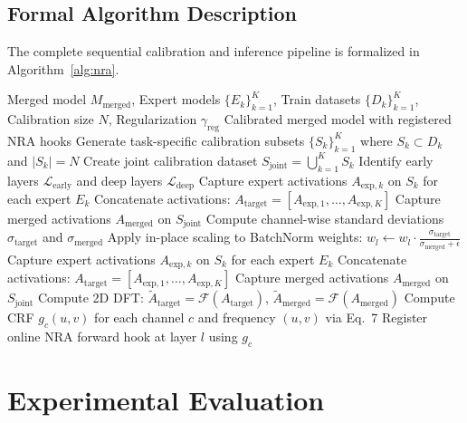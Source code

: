 \documentclass{article}
\theoremstyle{plain}
\theoremstyle{definition}
\theoremstyle{remark}
\begin{document}
\subsection{Formal Algorithm Description}
The complete sequential calibration and inference pipeline is formalized in Algorithm~\ref{alg:nra}.

\begin{algorithm}[H]
\caption{Sequential Hybrid SP-TAAC + NRA Calibration}
\label{alg:nra}
\begin{algorithmic}[1]
\REQUIRE Merged model $M_{\text{merged}}$, Expert models $\{E_k\}_{k=1}^K$, Train datasets $\{D_k\}_{k=1}^K$, Calibration size $N$, Regularization $\gamma_{\text{reg}}$
\ENSURE Calibrated merged model with registered NRA hooks
\STATE Generate task-specific calibration subsets $\{S_k\}_{k=1}^K$ where $S_k \subset D_k$ and $|S_k| = N$
\STATE Create joint calibration dataset $S_{\text{joint}} = \bigcup_{k=1}^K S_k$
\STATE Identify early layers $\mathcal{L}_{\text{early}}$ and deep layers $\mathcal{L}_{\text{deep}}$
    \STATE Capture expert activations $A_{\text{exp}, k}$ on $S_k$ for each expert $E_k$
    \STATE Concatenate activations: $A_{\text{target}} = [A_{\text{exp}, 1}, \dots, A_{\text{exp}, K}]$
    \STATE Capture merged activations $A_{\text{merged}}$ on $S_{\text{joint}}$
    \STATE Compute channel-wise standard deviations $\sigma_{\text{target}}$ and $\sigma_{\text{merged}}$
    \STATE Apply in-place scaling to BatchNorm weights: $w_l \leftarrow w_l \cdot \frac{\sigma_{\text{target}}}{\sigma_{\text{merged}} + \epsilon}$
\ENDFOR
{}
    \STATE Capture expert activations $A_{\text{exp}, k}$ on $S_k$ for each expert $E_k$
    \STATE Concatenate activations: $A_{\text{target}} = [A_{\text{exp}, 1}, \dots, A_{\text{exp}, K}]$
    \STATE Capture merged activations $A_{\text{merged}}$ on $S_{\text{joint}}$
    \STATE Compute 2D DFT: $\tilde{A}_{\text{target}} = \mathcal{F}(A_{\text{target}})$, $\tilde{A}_{\text{merged}} = \mathcal{F}(A_{\text{merged}})$
    \STATE Compute CRF $g_c(u, v)$ for each channel $c$ and frequency $(u, v)$ via Eq.~7
    \STATE Register online NRA forward hook at layer $l$ using $g_c$
\ENDFOR
\end{algorithmic}
\end{algorithm}

\section{Experimental Evaluation}
\label{submission-experiments}
\end{document}
